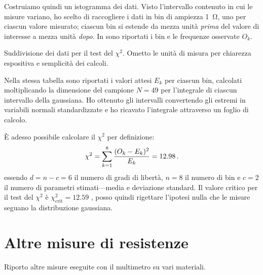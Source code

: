            Costruiamo quindi un istogramma dei dati. Visto l'intervallo contenuto in cui le misure variano, ho scelto di raccogliere i dati in bin di ampiezza \SI{1}{\ohm}, uno per ciascun valore misurato; ciascun bin si estende da mezza unità \emph{prima} del valore di interesse a mezza unità \emph{dopo}. In  sono riportati i bin e le frequenze osservate $O_k$.
            \begin{table}
                \centering
                
                \caption{Suddivisione dei dati per il test del $\chi^2$. Ometto le unità di misura per chiarezza espositiva e semplicità dei calcoli.}
                \label{tab:mul:bin-istogramma}
            \end{table}

            Nella stessa tabella sono riportati i valori attesi $E_k$ per ciascun bin, calcolati moltiplicando la dimensione del campione $N = 49$ per l'integrale di ciascun intervallo della gaussiana. Ho ottenuto gli intervalli convertendo gli estremi in variabili normali standardizzate e ho ricavato l'integrale attraverso un foglio di calcolo.

            È adesso possibile calcolare il $\chi^2$ per definizione:
            \begin{equation*}
                \chi^2
                = \sum_{k=1}^{8} \frac{(O_k - E_k)^2}{E_k}
                = \num{12.98}
                \,.
            \end{equation*}
            essendo $d = n - c = 6$ il numero di gradi di libertà, $n = 8$ il numero di bin e $c = 2$ il numero di parametri stimati---media e deviazione standard. Il valore critico per il test del $\chi^2$ è $\chi^2_\text{crit}= \num{12.59}$ \cite{chi2-table}, posso quindi rigettare l'ipotesi nulla che le misure seguano la distribuzione gaussiana.

    \section{Altre misure di resistenze}
        Riporto altre misure eseguite con il multimetro su vari materiali.
        
